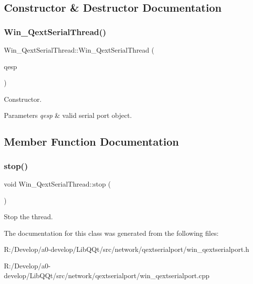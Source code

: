 \subsection{Constructor \& Destructor Documentation}
\mbox{\label{class_win___qext_serial_thread_aaf0e9331f2cc235ba93b1f678d918a6e}} 
\subsubsection{\texorpdfstring{Win\+\_\+\+Qext\+Serial\+Thread()}{Win\_QextSerialThread()}}
{\footnotesize\ttfamily Win\+\_\+\+Qext\+Serial\+Thread\+::\+Win\+\_\+\+Qext\+Serial\+Thread (\begin{DoxyParamCaption}\item[{\mbox{\hyperlink{class_win___qext_serial_port}{Win\+\_\+\+Qext\+Serial\+Port}} $\ast$}]{qesp }\end{DoxyParamCaption})}

Constructor.


\begin{DoxyParams}{Parameters}
{\em qesp} & valid serial port object. \\
\hline
\end{DoxyParams}


\subsection{Member Function Documentation}
\mbox{\label{class_win___qext_serial_thread_a36989d3d8cf24965092ce32bba8387d2}} 
\subsubsection{\texorpdfstring{stop()}{stop()}}
{\footnotesize\ttfamily void Win\+\_\+\+Qext\+Serial\+Thread\+::stop (\begin{DoxyParamCaption}{ }\end{DoxyParamCaption})}

Stop the thread. 

The documentation for this class was generated from the following files\+:\begin{DoxyCompactItemize}
\item 
R\+:/\+Develop/a0-\/develop/\+Lib\+Q\+Qt/src/network/qextserialport/win\+\_\+qextserialport.\+h\item 
R\+:/\+Develop/a0-\/develop/\+Lib\+Q\+Qt/src/network/qextserialport/win\+\_\+qextserialport.\+cpp\end{DoxyCompactItemize}
